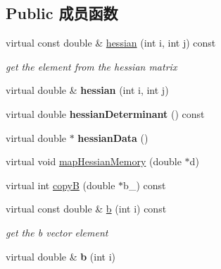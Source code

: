\subsection*{Public 成员函数}
\begin{DoxyCompactItemize}
\item 
\hypertarget{classg2o_1_1BaseVertex_ac591409722e675a3b69b9157fb5c7933}{virtual const double \& \hyperlink{classg2o_1_1BaseVertex_ac591409722e675a3b69b9157fb5c7933}{hessian} (int i, int j) const }\label{classg2o_1_1BaseVertex_ac591409722e675a3b69b9157fb5c7933}

\begin{DoxyCompactList}\small\item\em get the element from the hessian matrix \end{DoxyCompactList}\item 
\hypertarget{classg2o_1_1BaseVertex_a6ab2212fdb00dec460299fdbabe09cb9}{virtual double \& {\bfseries hessian} (int i, int j)}\label{classg2o_1_1BaseVertex_a6ab2212fdb00dec460299fdbabe09cb9}

\item 
\hypertarget{classg2o_1_1BaseVertex_a4f302a5d56f733a93fe5e98b49a20a07}{virtual double {\bfseries hessian\-Determinant} () const }\label{classg2o_1_1BaseVertex_a4f302a5d56f733a93fe5e98b49a20a07}

\item 
\hypertarget{classg2o_1_1BaseVertex_aedf92fbb5c2c86185422a955be02a3a6}{virtual double $\ast$ {\bfseries hessian\-Data} ()}\label{classg2o_1_1BaseVertex_aedf92fbb5c2c86185422a955be02a3a6}

\item 
virtual void \hyperlink{classg2o_1_1BaseVertex_a54227ac315e6bc75c63ed117a2c75668}{map\-Hessian\-Memory} (double $\ast$d)
\item 
virtual int \hyperlink{classg2o_1_1BaseVertex_ae9d3f6d4ac4effb78df958df30204c5b}{copy\-B} (double $\ast$b\-\_\-) const 
\item 
\hypertarget{classg2o_1_1BaseVertex_ae50dec87bfcb6a874ba87512c61bada7}{virtual const double \& \hyperlink{classg2o_1_1BaseVertex_ae50dec87bfcb6a874ba87512c61bada7}{b} (int i) const }\label{classg2o_1_1BaseVertex_ae50dec87bfcb6a874ba87512c61bada7}

\begin{DoxyCompactList}\small\item\em get the b vector element \end{DoxyCompactList}\item 
\hypertarget{classg2o_1_1BaseVertex_a5c235369ef3fb58de65b90c8cc37d611}{virtual double \& {\bfseries b} (int i)}\label{classg2o_1_1BaseVertex_a5c235369ef3fb58de65b90c8cc37d611}


\end{DoxyCompactItemize}

